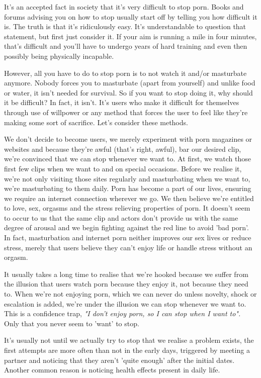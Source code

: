 \documentclass[easypeasy.tex]{subfiles}
\begin{document}
It's an accepted fact in society that it's very difficult to stop porn. Books and forums advising you on how to stop usually start off by telling you how difficult it is. The truth is that it's ridiculously easy. It's understandable to question that statement, but first just consider it. If your aim is running a mile in four minutes, that's difficult and you'll have to undergo years of hard training and even then possibly being physically incapable.

However, all you have to do to stop porn is to not watch it and/or masturbate anymore. Nobody forces you to masturbate (apart from yourself) and unlike food or water, it isn't needed for survival. So if you want to stop doing it, why should it be difficult? In fact, it isn't. It's users who make it difficult for themselves through use of willpower or any method that forces the user to feel like they're making some sort of sacrifice. Let's consider these methods.

We don't decide to become users, we merely experiment with porn magazines or websites and because they're awful (that's right, awful), bar our desired clip, we're convinced that we can stop whenever we want to. At first, we watch those first few clips when we want to and on special occasions. Before we realise it, we're not only visiting those sites regularly and masturbating when we want to, we're masturbating to them daily. Porn has become a part of our lives, ensuring we require an internet connection wherever we go. We then believe we're entitled to love, sex, orgasms and the stress relieving properties of porn. It doesn't seem to occur to us that the same clip and actors don't provide us with the same degree of arousal and we begin fighting against the red line to avoid 'bad porn'. In fact, masturbation and internet porn neither improves our sex lives or reduce stress, merely that users believe they can't enjoy life or handle stress without an orgasm.

It usually takes a long time to realise that we're hooked because we suffer from the illusion that users watch porn because they enjoy it, not because they need to. When we're not enjoying porn, which we can never do unless novelty, shock or escalation is added, we're under the illusion we can stop whenever we want to. This is a confidence trap, \textit{"I don't enjoy porn, so I can stop when I want to".} Only that you never seem to 'want' to stop.

It's usually not until we actually try to stop that we realise a problem exists, the first attempts are more often than not in the early days, triggered by meeting a partner and noticing that they aren't 'quite enough' after the initial dates. Another common reason is noticing health effects present in daily life.
\end{document}
